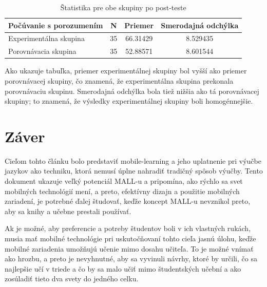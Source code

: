 \documentclass[10pt,oneside,slovak,a4paper]{article}
\begin{document}


\begin{table}[tbh]
\centering
\begin{tabular}{@{}|l|c|c|c|@{}}
\toprule
Počúvanie s porozumením & N  & Priemer  & Smerodajná odchýlka \\ \midrule
Experimentálna skupina  & 35 & 66.31429 & 8.529435            \\ \midrule
Porovnávacia skupina    & 35 & 52.88571 & 8.601544            \\ \bottomrule
\end{tabular}
\caption{\label{tab:Štatistika}Štatistika pre obe skupiny po post-teste}
\end{table}

Ako ukazuje tabuľka, priemer experimentálnej skupiny bol vyšší ako priemer porovnávacej skupiny, čo znamená, že experimentálna skupina prekonala porovnávaciu skupinu. Smerodajná odchýlka bola tiež nižšia ako tá porovnávacej skupiny; to znamená, že výsledky experimentálnej skupiny boli homogénnejšie.



\section{Záver} \label{zaver} %

Cieľom tohto článku bolo predstaviť mobile-learning a jeho uplatnenie pri výučbe jazykov ako techniku, ktorá nemusí úplne nahradiť tradičný spôsob výučby. Tento dokument ukazuje veľký potenciál MALL-u a pripomína, ako rýchlo sa svet mobilných technológií mení, a preto, efektívny dizajn a použitie mobilných zariadení, je potrebné ďalej študovať, keďže koncept MALL-u nevznikol preto, aby sa knihy a učebne prestali používať\cite{Kim2012}.

Ak je možné, aby preferencie a potreby študentov boli v ich vlastných rukách, musia mať mobilné technológie pri uskutočňovaní tohto cieľa jasnú úlohu, keďže mobilné zariadenia umožňujú učenie mimo dosahu učiteľa\cite{KukulskaHulme2009}. To je možné vnímať ako hrozbu, a preto je nevyhnutné, aby sa vyvinuli návrhy, ktoré by určili, čo sa najlepšie učí v triede a čo by sa malo učiť mimo študentských učební a ako zosúladiť tieto dva svety do jedného celku.
\end{document}
